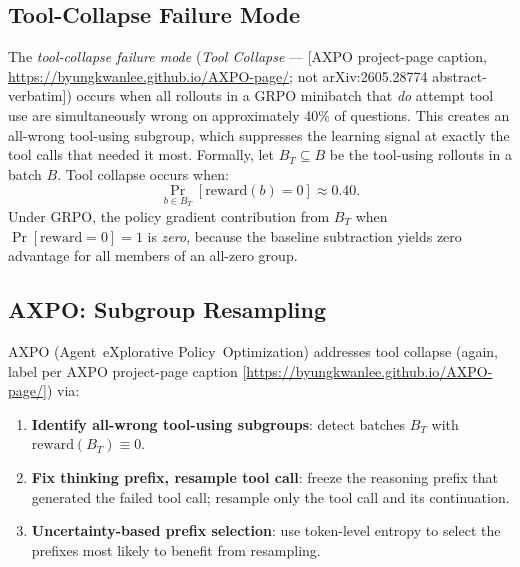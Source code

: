 \subsection{Tool-Collapse Failure Mode}
\label{ssec:tool-collapse}

The \emph{tool-collapse failure mode}
(\emph{Tool Collapse} ---
[AXPO project-page caption, \url{https://byungkwanlee.github.io/AXPO-page/};
not arXiv:2605.28774 abstract-verbatim])
occurs when all rollouts in a
GRPO minibatch that \emph{do} attempt tool use are simultaneously wrong
on approximately 40\% of questions.  This creates an all-wrong tool-using
subgroup, which suppresses the learning signal at exactly the tool calls
that needed it most.  Formally, let \(B_T \subseteq B\) be the tool-using
rollouts in a batch \(B\).  Tool collapse occurs when:
\[
  \Pr_{b \in B_T}[\mathrm{reward}(b) = 0] \approx 0.40.
\]
Under GRPO, the policy gradient contribution from \(B_T\) when
\(\Pr[\mathrm{reward} = 0] = 1\) is \emph{zero}, because the baseline
subtraction yields zero advantage for all members of an all-zero group.

\subsection{AXPO: Subgroup Resampling}
\label{ssec:axpo-resampling}

AXPO (Agent~eXplorative Policy~Optimization) addresses tool collapse
(again, label per AXPO project-page caption
[\url{https://byungkwanlee.github.io/AXPO-page/}]) via:

\begin{enumerate}
  \item \textbf{Identify all-wrong tool-using subgroups}: detect batches
    \(B_T\) with \(\mathrm{reward}(B_T) \equiv 0\).
  \item \textbf{Fix thinking prefix, resample tool call}: freeze the
    reasoning prefix that generated the failed tool call; resample only
    the tool call and its continuation.
  \item \textbf{Uncertainty-based prefix selection}: use token-level
    entropy to select the prefixes most likely to benefit from resampling.
\end{enumerate}

